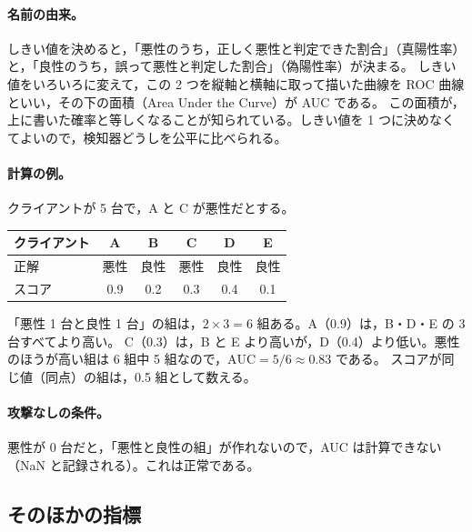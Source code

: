 \documentclass[a4j, dvipdfmx]{jsarticle}  %
\begin{document}
\paragraph{名前の由来。}
しきい値を決めると，「悪性のうち，正しく悪性と判定できた割合」（真陽性率）と，「良性のうち，誤って悪性と判定した割合」（偽陽性率）が決まる。
しきい値をいろいろに変えて，この 2 つを縦軸と横軸に取って描いた曲線を ROC 曲線といい，その下の面積（Area Under the Curve）が AUC である。
この面積が，上に書いた確率と等しくなることが知られている。しきい値を 1 つに決めなくてよいので，検知器どうしを公平に比べられる。

\paragraph{計算の例。}
クライアントが 5 台で，A と C が悪性だとする。

\begin{table}[H]
\centering
\begin{tabular}{@{}lccccc@{}}
\toprule
クライアント & A & B & C & D & E \\
\midrule
正解 & 悪性 & 良性 & 悪性 & 良性 & 良性 \\
スコア & 0.9 & 0.2 & 0.3 & 0.4 & 0.1 \\
\bottomrule
\end{tabular}
\end{table}

「悪性 1 台と良性 1 台」の組は，$2 \times 3 = 6$ 組ある。A（0.9）は，B・D・E の 3 台すべてより高い。
C（0.3）は，B と E より高いが，D（0.4）より低い。悪性のほうが高い組は 6 組中 5 組なので，$\mathrm{AUC} = 5/6 \approx 0.83$ である。
スコアが同じ値（同点）の組は，0.5 組として数える。

\paragraph{攻撃なしの条件。}
悪性が 0 台だと，「悪性と良性の組」が作れないので，AUC は計算できない（NaN と記録される）。これは正常である。

\subsection{そのほかの指標}
\end{document}
